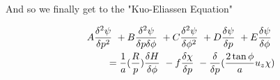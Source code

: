 \documentclass{article}
\begin{document}
And so we finally get to the "Kuo-Eliassen Equation"

\begin{eqnarray}
A \frac{\delta^2 \psi}{\delta p^2} \
+ B \frac{\delta^2 \psi}{\delta p \delta \phi} \
+ C \frac{\delta^2 \psi}{\delta \phi^2} \
+ D \frac{\delta \psi}{\delta p} \
+ E \frac{\delta \psi}{\delta \phi} \
\nonumber\\
= \frac{1}{a} (\frac{R}{p}) \frac{\delta H}{\delta \phi} \
- f \frac{\delta \chi}{\delta p} \
- \frac{\delta}{\delta p} (\frac{2 \tan \phi}{a} u_z \chi)
\end{eqnarray}
\end{document}
